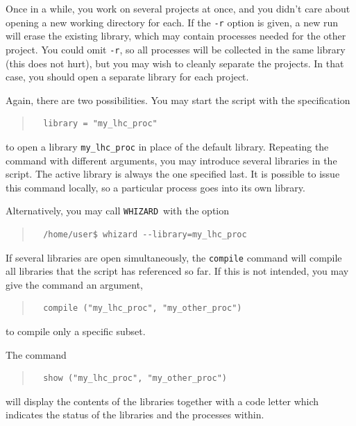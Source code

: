 \documentclass[12pt]{book}
\newcommand{\ttt}[1]{\texttt{#1}}
\newcommand{\whizard}{\texttt{WHIZARD}}
\begin{document}
Once in a while, you work on several projects at once, and you didn't care
about opening a new working directory for each.  If the \verb|-r| option is
given, a new run will erase the existing library, which may contain processes
needed for the other project.  You could omit \verb|-r|, so all processes will
be collected in the same library (this does not hurt), but you may wish to
cleanly separate the projects.  In that case, you should open a separate
library for each project.

Again, there are two possibilities.  You may start the script with the
specification
\begin{quote}
\begin{footnotesize}
\begin{verbatim}
  library = "my_lhc_proc"  
\end{verbatim}
\end{footnotesize}
\end{quote}
to open a library \verb|my_lhc_proc| in place of the default library.
Repeating the command with different arguments, you may introduce several
libraries in the script.  The active library is always the one specified
last.  It is possible to issue this command locally, so a particular process
goes into its own library.

Alternatively, you may call \whizard\ with the option
\begin{quote}
\begin{footnotesize}
\begin{verbatim}
  /home/user$ whizard --library=my_lhc_proc  
\end{verbatim}
\end{footnotesize}
\end{quote}

If several libraries are open simultaneously, the \ttt{compile} command will
compile all libraries that the script has referenced so far.  If this is not
intended, you may give the command an argument,
\begin{quote}
\begin{footnotesize}
\begin{verbatim}
  compile ("my_lhc_proc", "my_other_proc")
\end{verbatim}
\end{footnotesize}
\end{quote}
to compile only a specific subset.

The command
\begin{quote}
\begin{footnotesize}
\begin{verbatim}
  show ("my_lhc_proc", "my_other_proc")
\end{verbatim}
\end{footnotesize}
\end{quote}
will display the contents of the libraries together with a code letter which
indicates the status of the libraries and the processes within.
\end{document}
